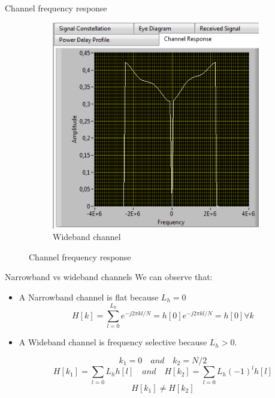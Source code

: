 \documentclass{beamer}
\begin{document}
\begin{frame}{Channel frequency response}
\begin{figure}[h!]
\begin{subfigure}[b]{0.45 \textwidth}
                   \includegraphics[width=\textwidth]{wideRep.PNG}
                        \caption{Wideband channel}\label{fig:4}
                    \end{subfigure}
                    \caption{Channel frequency response}\label{fig:const}
                \end{figure}
\end{frame}

\begin{frame}{Narrowband vs wideband channels}
    We can observe that:
	\begin{itemize}
		\item A Narrowband channel is flat because $L_h=0$
		 	$$ H[k] = \sum_{l=0}^{L_h} e^{-j2\pi kl/N} = h[0]e^{-j2\pi kl/N} = h[0] \forall k$$
		\item A Wideband channel is frequency selective because $L_h > 0$.
	
		$$ k_1 = 0 \quad and \quad k_2 = N/2$$
			$$ H[k_1] = \sum_{l=0}{L_h} h[l] \quad and \quad H[k_2] = \sum_{l=0}{L_h}(-1)^lh[l]$$
			$$ H[k_1] \neq H[k_2] $$
	\end{itemize}
\end{frame}
\end{document}
